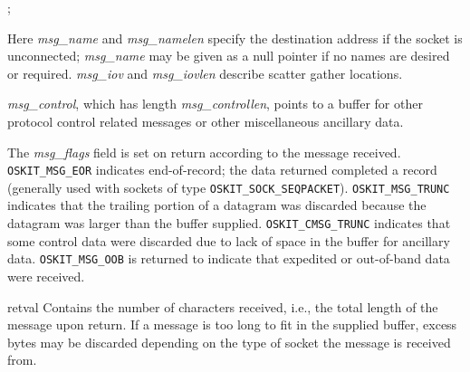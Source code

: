 \begin{apiparm}
;

	Here \emph{msg_name} and \emph{msg_namelen} 
	specify the destination address if the socket is unconnected;
	\emph{msg_name} may be given as a null pointer if no names are desired 
	or required.
	\emph{msg_iov} and \emph{msg_iovlen} describe scatter gather
	locations. 
	
	\emph{msg_control}, which has length \emph{msg_controllen},
	points to a buffer for other protocol control related
	messages or other miscellaneous ancillary data.


	The \emph{msg_flags} field is set on return according to the message 
	received. \texttt{OSKIT_MSG_EOR}  indicates end-of-record; the data 
	returned completed a record (generally used with sockets of type
	\texttt{OSKIT_SOCK_SEQPACKET}). \texttt{OSKIT_MSG_TRUNC} indicates
	that the trailing portion of a datagram was discarded because
	the datagram was larger than the buffer supplied.
	\texttt{OSKIT_CMSG_TRUNC} indicates that some
	control data were discarded due to lack of space in the
	buffer for ancillary data. \texttt{OSKIT_MSG_OOB} is returned to
	indicate that expedited or out-of-band data were received.

        \item[retval]
                Contains the number of characters received, i.e., the total
		length of the message upon return.
		If a message is too long to fit in the supplied buffer,
		excess bytes may be discarded depending on the type of socket 
		the message is received from.

\end{apiparm}

